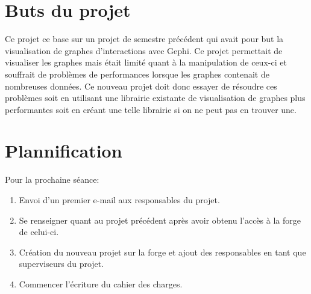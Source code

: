 \documentclass{article}
\begin{document}
\section{Buts du projet}
Ce projet ce base sur un projet de semestre précédent qui avait pour but la visualisation de graphes d'interactions avec Gephi. Ce projet permettait de visualiser les graphes mais était limité quant à la manipulation de ceux-ci et souffrait de problèmes de performances lorsque les graphes contenait de nombreuses données.
Ce nouveau projet doit donc essayer de résoudre ces problèmes soit en utilisant une librairie existante de visualisation de graphes plus performantes soit en créant une telle librairie si on ne peut pas en trouver une.

\section{Plannification}
Pour la prochaine séance:
\begin{enumerate}
  \item Envoi d'un premier e-mail aux responsables du projet.
  \item Se renseigner quant au projet précédent après avoir obtenu l'accès à la forge de celui-ci.
  \item Création du nouveau projet sur la forge et ajout des responsables en tant que superviseurs du projet.
  \item Commencer l'écriture du cahier des charges.
\end{enumerate}



\begingroup
  
  
  \nocite{*}
\endgroup
\end{document}

